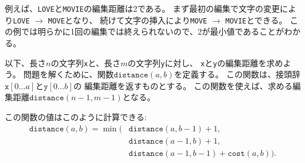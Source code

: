 例えば、\texttt{LOVE}と\texttt{MOVIE}の編集距離は2である。
まず最初の編集で文字の変更により\texttt{LOVE} $\rightarrow$ \texttt{MOVE}となり、
続けて文字の挿入により\texttt{MOVE} $\rightarrow$ \texttt{MOVIE}とできる。
この例では明らかに1回の編集では終えられないので、2が最小値であることがわかる。

\begin{comment}
Suppose that we are given a string \texttt{x}
of length $n$ and a string \texttt{y} of length $m$,
and we want to calculate the edit distance between
\texttt{x} and \texttt{y}.
To solve the problem, we define a function
$\texttt{distance}(a,b)$ that gives the
edit distance between prefixes
$\texttt{x}[0 \ldots a]$ and $\texttt{y}[0 \ldots b]$.
Thus, using this function, the edit distance
between \texttt{x} and \texttt{y} equals $\texttt{distance}(n-1,m-1)$.

We can calculate values of \texttt{distance}
as follows:
\end{comment}

以下、長さ$n$の文字列\texttt{x}と、長さ$m$の文字列\texttt{y}に対し、
\texttt{x}と\texttt{y}の編集距離を求めよう。
問題を解くために、関数$\texttt{distance}(a,b)$を定義する。
この関数は、接頭辞$\texttt{x}[0 \ldots a]$と$\texttt{y}[0 \ldots b]$の
編集距離を返すものとする。
この関数を使えば、求める編集距離$\texttt{distance}(n-1,m-1)$となる。

この関数の値はこのように計算できる:
\begin{equation*}
\begin{split}
\texttt{distance}(a,b) = \min(& \texttt{distance}(a,b-1)+1, \\
                           & \texttt{distance}(a-1,b)+1, \\
                           & \texttt{distance}(a-1,b-1)+\texttt{cost}(a,b)).
\end{split}
\end{equation*}

\begin{comment}
Here $\texttt{cost}(a,b)=0$ if $\texttt{x}[a]=\texttt{y}[b]$,
and otherwise $\texttt{cost}(a,b)=1$.
The formula considers the following ways to
edit the string \texttt{x}:
\begin{itemize}
\item $\texttt{distance}(a,b-1)$: insert a character at the end of \texttt{x}
\item $\texttt{distance}(a-1,b)$: remove the last character from \texttt{x}
\item $\texttt{distance}(a-1,b-1)$: match or modify the last character of \texttt{x}
\end{itemize}
\end{comment}

